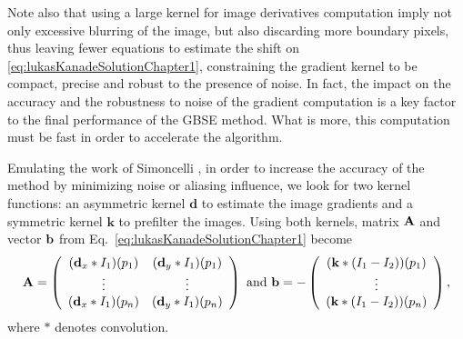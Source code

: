 Note also that using a large kernel for image derivatives computation imply not only excessive blurring of the image, but also discarding more boundary pixels, thus leaving fewer equations to estimate the shift on \eqref{eq:lukasKanadeSolutionChapter1}, constraining the gradient kernel to be compact, precise and robust to the presence of noise. In fact, the impact on the accuracy and the robustness to noise of the gradient computation is a key factor to the final performance of the GBSE method. What is more, this computation must be fast in order to accelerate the algorithm. 

Emulating the work of Simoncelli \cite{Simoncelli_1994}, in order to increase the accuracy of the method by minimizing noise or aliasing influence, we look for two kernel functions: an asymmetric kernel $\mathbf{d}$ to estimate the image gradients and a symmetric kernel $\mathbf{k}$ to prefilter the images. Using both kernels, matrix $\mathbf{A}$ and vector $\mathbf{b}$ from Eq.~\eqref{eq:lukasKanadeSolutionChapter1} become %
 \begin{equation}
 \bA = \left(
 \begin{array}[h!]{cc}
 (\mathbf{d}_x * I_1)(p_1) & (\mathbf{d}_y * I_1)(p_1) \\
 \vdots & \vdots \\
 (\mathbf{d}_x * I_1)(p_n) & (\mathbf{d}_y * I_1)(p_n) 
 \end{array}
 \right)  \text{ and }
 \bb = -\left(
 \begin{array}[h!]{c}
 (\mathbf{k} * (I_1 - I_2))(p_1) \\
 \vdots \\
 (\mathbf{k} * (I_1 - I_2))(p_n)
 \end{array}
 \right),
 \label{eq:smoothedGradientsForGBSE}
 \end{equation}
 where $*$ denotes convolution. 

